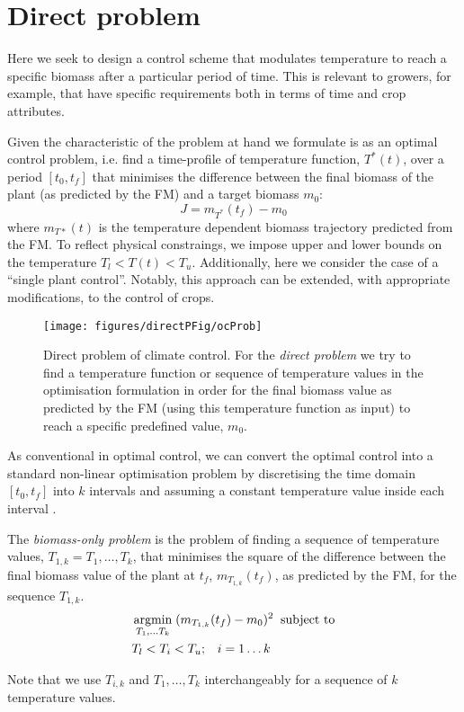 \section{Direct problem}
Here we seek to design a control scheme that modulates temperature to reach a
specific biomass after a particular period of time. This is relevant to growers,
for example, that have specific requirements both in terms of time and crop
attributes.

Given the characteristic of the problem at hand we formulate is as an optimal
control problem, i.e. find a time-profile of temperature function, $T^*(t)$,
over a period $[t_0, t_f]$ that minimises the difference between the final
biomass of the plant (as predicted by the FM) and a target biomass $m_0$:
$$
J = m_{T^*}(t_f) - m_0
$$
where $m_{T*}(t)$ is the temperature dependent biomass trajectory predicted from
the FM. To reflect physical constraings, we impose upper and lower bounds on the
temperature $T_l < T(t) < T_u$. Additionally, here we consider the case of a
``single plant control''. Notably, this approach can be extended, with
appropriate modifications, to the control of crops.

\begin{figure}[tb]
\centering
\texttt{[image: figures/directPFig/ocProb]}
\caption{Direct problem of climate control. For the \emph{direct problem} we try
  to find a temperature function or sequence of temperature values in the
  optimisation formulation in order for the final biomass value as predicted by
  the FM (using this temperature function as input) to reach a specific
  predefined value, $m_0$.}
\label{fig:directP}
\end{figure}

As conventional in optimal control, we can convert the optimal control into a
standard non-linear optimisation problem by discretising the time domain
$[t_0, t_f]$ into $k$ intervals and assuming a constant temperature value inside
each interval \citep{kraft_converting_1985}.
\begin{definition}
The \emph{biomass-only problem} is the problem of finding a sequence of
temperature values, $T_{1, k}=T_1, \dots, T_k$, that minimises the square of the
difference between the final biomass value of the plant at $t_f$,
$m_{T_{1, k}}(t_f)$, as predicted by the FM, for the sequence $T_{1, k}$.
\begin{align*}
& \operatorname*{argmin}_{T_1, \dots T_k} \; (m_{T_{1, k}}(t_f) - m_0)^2 \; \; \text{subject to} \\
& T_l < T_{i} < T_u; \; \; \; i=1 \dots k
\end{align*}
\end{definition}
Note that we use $T_{i, k}$ and $T_1, \dots, T_k$ interchangeably for a sequence of
$k$ temperature values.

